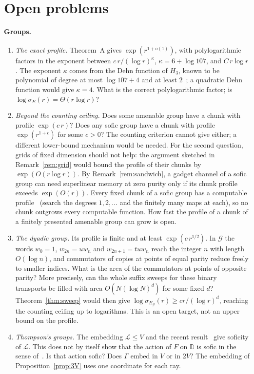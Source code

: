 \section{Open problems}\label{sec:open}

\paragraph{Groups.}

\begin{enumerate}[label=(\arabic*)]
\item \emph{The exact profile.} Theorem~A gives $\exp(r^{1+o(1)})$, with polylogarithmic factors in the exponent between
$c\,r/(\log r)^{\kappa}$, $\kappa=6+\log107$, and $C\,r\log r$. The exponent $\kappa$ comes from the Dehn function of $H_3$, known to be polynomial of
degree at most $\log107+4$ and at least $2$~\cite{DouglasMghirbiA}; a quadratic Dehn function would give $\kappa=4$. What is the correct
polylogarithmic factor; is $\log\sigma_E(r)=\Theta(r\log r)$?
\item \emph{Beyond the counting ceiling.} Does some amenable group have a chunk with profile $\exp(c\,r)$? Does any sofic group have a chunk with
profile $\exp(r^{1+c})$ for some $c>0$? The counting criterion cannot give either; a different lower-bound mechanism would be needed. For the
second question, grids of fixed dimension should not help: the argument sketched in Remark~\ref{rem:grid} would bound the profile of their
chunks by $\exp(O(r\log r))$. By
Remark~\ref{rem:sandwich}, a gadget channel of a sofic group can need superlinear memory at zero purity only if its chunk profile exceeds
$\exp(O(r))$. Every fixed chunk of a sofic group has a computable profile~\cite[Lemma~1]{Ivanov2021} (search the degrees $1,2,\dots$ and the finitely
many maps at each), so no chunk outgrows every computable function. How fast the profile of a chunk of a finitely presented amenable group can grow is
open.
\item \emph{The dyadic group.} Its profile is finite and at least $\exp(c\,r^{1/2})$. In $\mathcal G$ the words $w_0=1$,
$w_{2n}=uw_n$ and $w_{2n+1}=tuw_n$ reach the integer $n$ with length $O(\log n)$, and commutators of copies at points of equal parity reduce
freely to smaller indices. What is the area of the commutators at points of opposite parity? More precisely, can the whole suffix sweeps for these binary transports
be filled with area $O(N(\log N)^d)$ for some fixed $d$? Theorem~\ref{thm:sweep} would then give
$\log\sigma_{E_{\mathcal G}}(r)\ge c r/(\log r)^d$, reaching the counting ceiling up to logarithms. This is an open target, not an upper bound on the profile.
\item \emph{Thompson's groups.} The embedding $\mathcal L\le V$ and the
recent result~\cite[Theorem~1.1]{CJM2026} give soficity of $\mathcal L$.
This does not by itself show that the action of $F$ on $\mathbb D$ is
sofic in the sense of~\cite{GKEP2025}. Is that action sofic?
Does $\Gamma$ embed in $V$ or
in $2V$? The embedding of Proposition~\ref{prop:3V} uses one coordinate for each ray.
\end{enumerate}

